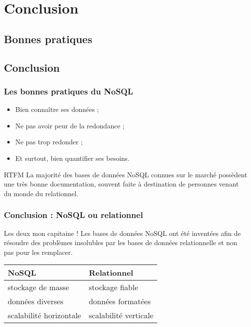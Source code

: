 \section{Conclusion}

	\subsection{Bonnes pratiques}
	\subsection{Conclusion}
	
	\begin{frame}
		\frametitle{Les bonnes pratiques du NoSQL}

		\begin{itemize}
			\item Bien connaître ses données ;
			\item Ne pas avoir peur de la redondance ;
			\item Ne pas trop redonder ;
			\item Et surtout, bien quantifier ses besoins.
		\end{itemize}


		\begin{block}{RTFM}
			La majorité des bases de données NoSQL connues sur le marché possèdent une très bonne documentation, souvent faite à destination de personnes venant du monde du relationnel.
		\end{block}
	\end{frame}
	
	\begin{frame}
		\frametitle{Conclusion : NoSQL ou relationnel}

		\begin{alertblock}{Les deux mon capitaine !}
			Les bases de données NoSQL ont été inventées afin de résoudre des problèmes insolubles par les bases de données relationnelle et non pas pour les remplacer.
		\end{alertblock}

		\vspace{20px}
		
		\begin{tabular}{|l|l|}
			\hline
			\textbf{NoSQL} & \textbf{Relationnel} \\ \hline\hline
			stockage de masse & stockage fiable \\ \hline
			données diverses & données formatées \\ \hline
			scalabilité horizontale & scalabilité verticale \\ \hline
		\end{tabular}

	\end{frame}
	
